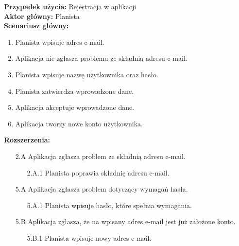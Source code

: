 \noindent
\textbf{Przypadek użycia:} Rejestracja w aplikacji\\
\textbf{Aktor główny:} Planista\\
\textbf{Scenariusz główny:}
\begin{enumerate}
	\item Planista wpisuje adres e-mail.
	\item Aplikacja nie zgłasza problemu ze składnią adresu e-mail.
	\item Planista wpisuje nazwę użytkownika oraz hasło.
	\item Planista zatwierdza wprowadzone dane.
	\item Aplikacja akceptuje wprowadzone dane.
	\item Aplikacja tworzy nowe konto użytkownika.
\end{enumerate}
\textbf{Rozszerzenia:}
	\begin{enumerate}
         \item[2.A] Aplikacja zgłasza problem ze składnią adresu e-mail.
         \begin{enumerate}
         	\item[2.A.1] Planista poprawia składnię adresu e-mail.
         \end{enumerate}
         \item[5.A] Aplikacja zgłasza problem  dotyczący wymagań hasła.
         \begin{enumerate}
         	\item[5.A.1] Planista wpisuje hasło, które spełnia wymagania.
         \end{enumerate}
         \item[5.B] Aplikacja zgłasza, że na wpisany adres e-mail jest już założone konto.
         \begin{enumerate}
         	\item[5.B.1] Planista wpisuje nowy adres e-mail.
         \end{enumerate}
	\end{enumerate}
	
